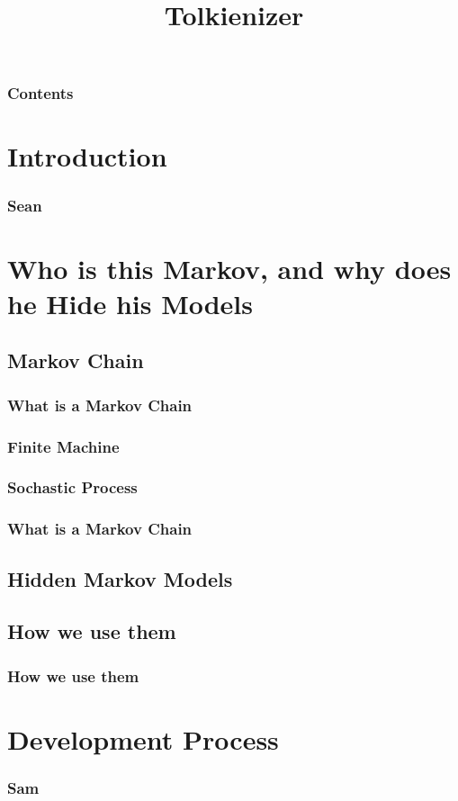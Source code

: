 \documentclass{beamer}
\title[Tolkienizer]{Tolkienizer}
\begin{document}
\begin{frame}
\titlepage
\end{frame}

\begin{frame}
   \frametitle{Contents}
   \tableofcontents[pausesections]
\end{frame}

\section{Introduction}

\begin{frame}
   \frametitle{Sean}
\end{frame}

\section{Who is this Markov, and why does he Hide his Models}

\subsection{Markov Chain}

\begin{frame}
   \frametitle{What is a Markov Chain}
\end{frame}

\begin{frame}
   \frametitle{Finite Machine}
\end{frame}

\begin{frame}
   \frametitle{Sochastic Process}
\end{frame}

\begin{frame}
   \frametitle{What is a Markov Chain}
\end{frame}

\subsection{Hidden Markov Models}
\begin{frame}
   \frametitle{}
\end{frame}

\subsection{How we use them}
\begin{frame}
   \frametitle{How we use them}
\end{frame}

\section{Development Process}

\begin{frame}
   \frametitle{Sam}
\end{frame}
\end{document}
